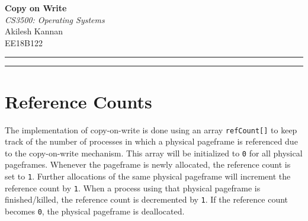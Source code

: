 \documentclass[12pt,a4paper,english]{paper}
\def \courseNumber {CS3500}
\def \courseName {Operating Systems}
\def \assignmentName {Copy on Write}
\def \myName {Akilesh Kannan}
\def \rollNumber {EE18B122}
\begin{document}
 
\thispagestyle{empty}
\vspace{-4.5cm}

\hspace*{-\parindent}
\begin{minipage}{0.65\textwidth}
{\fontsize{22pt}{10pt}\selectfont\textbf{\assignmentName}}\\[1mm]
\Large
\textit{\courseNumber: \courseName}\\[5mm]
\Large \myName \\
\normalsize \rollNumber \\
\end{minipage}\hfill%

\hrule \hrule
\medskip
\vspace{-0.2cm}

\section{Reference Counts}
The implementation of copy-on-write is done using an array \texttt{refCount[]} to keep track of the number of processes in which a physical pageframe is referenced due to the copy-on-write mechanism.
This array will be initialized to {\tt 0} for all physical pageframes. Whenever the pageframe is newly allocated, the reference count is set to {\tt 1}. 
Further allocations of the same physical pageframe will increment the reference count by {\tt 1}.
When a process using that physical pageframe is finished/killed, the reference count is decremented by {\tt 1}. If the reference count becomes {\tt 0}, the physical pageframe is deallocated.
\end{document}
